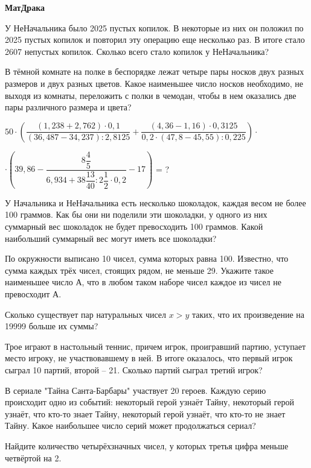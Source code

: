 \centerline{\bf \Huge МатДрака}

 У НеНачальника было 2025 пустых копилок. В некоторые из них он положил по 2025 пустых копилок и повторил эту операцию еще несколько раз. В итоге стало 2607 непустых копилок.
Сколько всего стало копилок у НеНачальника?

 В тёмной комнате на полке в беспорядке лежат четыре пары носков двух разных размеров и двух разных цветов. Какое наименьшее число носков необходимо, не выходя из комнаты, переложить с полки в чемодан, чтобы в нем оказались две пары различного размера и цвета?

 $50\cdot(\dfrac{(1,238+2,762) \cdot 0,1}{(36,487-34,237): 2,8125}+\dfrac{(4,36-1,16) \cdot 0,3125}{0,2 \cdot(47,8-45,55): 0,225})\cdot$ 

$\cdot(39,86-\dfrac{8 \dfrac{4}{5}}{6,934+38 \dfrac{13}{40}: 2 \dfrac{1}{2} \cdot 0,2}-17)$ = ?

 У Начальника и НеНачальника есть несколько шоколадок, каждая весом не более 100 граммов. Как бы они ни поделили эти шоколадки, у одного из них суммарный вес шоколадок не будет превосходить 100 граммов. Какой наибольший суммарный вес могут иметь все шоколадки?

 По окружности выписано 10 чисел, сумма которых равна 100. Известно, что сумма каждых трёх чисел, стоящих рядом, не меньше 29.
Укажите такое наименьшее число А, что в любом таком наборе чисел каждое из чисел не превосходит А.

 Сколько существует пар натуральных чисел $x > y$ таких, что их
произведение на 19999 больше их суммы?


 Трое играют в настольный теннис, причем игрок, проигравший партию, уступает место игроку, не участвовавшему в ней. В итоге оказалось, что первый игрок сыграл 10 партий, второй – 21. Сколько партий сыграл третий игрок?

 В сериале "Тайна Санта-Барбары" участвует 20 героев. Каждую серию происходит одно из событий: некоторый герой узнаёт Тайну, некоторый герой узнаёт, что кто-то знает Тайну, некоторый герой узнаёт, что кто-то не знает Тайну. Какое наибольшее число серий может продолжаться сериал?

\newpage

\hspace{3mm}

 Найдите количество четырёхзначных чисел, у которых третья цифра
меньше четвёртой на 2.


